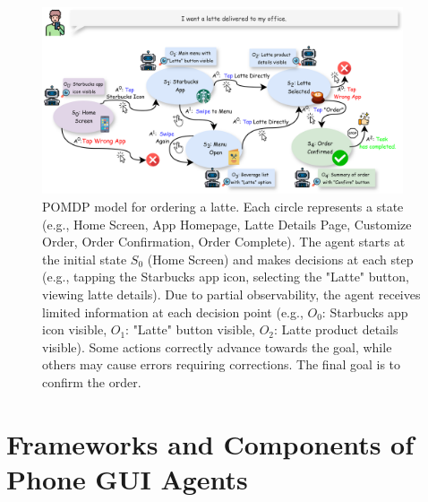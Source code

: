 \begin{figure}[ht]
    \centering
    \includegraphics[width=0.95\textwidth]{figures/basic_pipline_mdp.drawio.png}
    \caption{POMDP model for ordering a latte. Each circle represents a state (e.g., Home Screen, App Homepage, Latte Details Page, Customize Order, Order Confirmation, Order Complete). The agent starts at the initial state $S_0$ (Home Screen) and makes decisions at each step (e.g., tapping the Starbucks app icon, selecting the "Latte" button, viewing latte details). Due to partial observability, the agent receives limited information at each decision point (e.g., $O_0$: Starbucks app icon visible, $O_1$: "Latte" button visible, $O_2$: Latte product details visible). Some actions correctly advance towards the goal, while others may cause errors requiring corrections. The final goal is to confirm the order.}
    \label{fig:basic_pipline_mdp}
\end{figure}

\section{Frameworks and Components of Phone GUI Agents}
\label{sec:frameworks}

